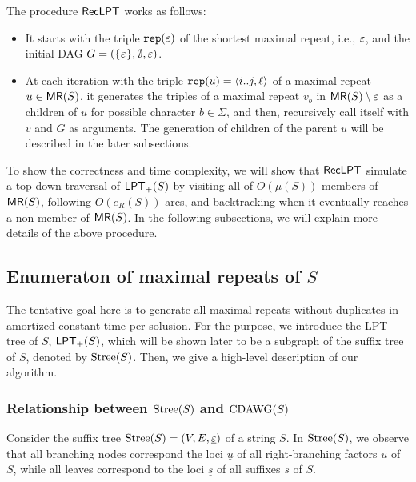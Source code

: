 \documentclass{article}
\begin{document}
The procedure $\textsf{RecLPT}$ works as follows: 
\begin{itemize}
\item It starts with the triple $\mathtt{rep}(\varepsilon)$ of the shortest maximal repeat, i.e., $\varepsilon$, and the initial DAG $G = (\{\kern0.05em\varepsilon\kern0.05em\}, \emptyset{}, \varepsilon)$. 
  
\item At each iteration with the triple $\mathtt{rep}(u) = \langle i..j, \ell\rangle$ of a maximal repeat $u \in \textsf{MR}(S)$, it generates the triples of a maximal repeat $v_b$ in $\textsf{MR}(S)\setminus{\varepsilon}$ as a children of $u$ for possible character $b\in\Sigma$, and then, recursively call itself with $v$ and $G$ as arguments. The generation of children of the parent $u$ will be described in the later subsections. 
\end{itemize}

To show the correctness and time complexity, we will show that $\textsf{RecLPT}$ simulate a top-down traversal of $\mathsf{LPT}_{+}(S)$ by visiting all of $O(\mu(S))$ members of $\textsf{MR}(S)$, following $O(e_R(S))$ arcs, and backtracking when it eventually reaches a non-member of $\textsf{MR}(S)$.
In the following subsections, we will explain more details of the above procedure. 


\subsection{Enumeraton of maximal repeats of $S$}  
\label{sec:enum:maxrep}
The tentative goal here is to generate all maximal repeats without duplicates in amortized constant time per solusion. For the purpose, we introduce the LPT tree of $S$, $\mathsf{LPT}_{+}(S)$, which will be shown later to be a subgraph of the suffix tree of $S$, denoted by $\mathrm{Stree}(S)$. Then, we give a high-level description of our algorithm.

\subsubsection{Relationship between $\mathrm{Stree}(S)$ and $\mathrm{CDAWG}(S)$}
Consider the suffix tree $\mathrm{Stree}(S) = (V, E, \underline{\varepsilon})$ of a string $S$. 
In $\mathrm{Stree}(S)$, we observe that all branching nodes correspond the loci $\underline u$ of all right-branching factors $u$ of $S$, while all leaves correspond to the loci $\underline s$ of all suffixes $s$ of $S$.
\end{document}
